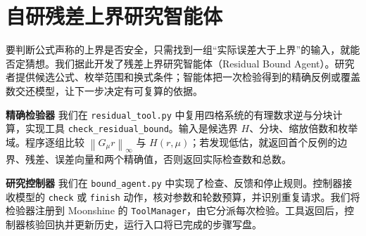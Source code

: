 \documentclass[UTF8,a4paper,12pt]{ctexart}
\newcommand{\papersectionbreak}{\par\addvspace{4.5mm}\Needspace{5\baselineskip}}
\newcommand{\para}[1]{\par\addvspace{.62\baselineskip}\noindent
  {\paperlabel\sffamily\bfseries\fontsize{10.7}{15}\selectfont\color{ink}#1}\hspace{.66em}\ignorespaces}
\newcommand{\norm}[1]{\left\lVert #1\right\rVert_\infty}
\begin{document}
\papersectionbreak
\clearpage
\section{自研残差上界研究智能体}\label{extension}
要判断公式声称的上界是否安全，只需找到一组“实际误差大于上界”的输入，就能否定猜想。我们据此开发了残差上界研究智能体（Residual Bound Agent）。研究者提供候选公式、枚举范围和换式条件；智能体把一次检验得到的精确反例或覆盖数交还模型，让下一步决定有可复算的依据。

\para{精确检验器} 我们在 \texttt{residual\_tool.py} 中复用四格系统的有理数求逆与分块计算，实现工具 \texttt{check\_residual\_bound}。输入是候选界 $H$、分块、缩放倍数和枚举域。程序逐组比较 $\norm{G_\mu r}$ 与 $H(r,\mu)$；若发现低估，就返回首个反例的边界、残差、误差向量和两个精确值，否则返回实际检查数和总数。

\para{研究控制器} 我们在 \texttt{bound\_agent.py} 中实现了检查、反馈和停止规则。控制器接收模型的 \texttt{check} 或 \texttt{finish} 动作，核对参数和轮数预算，并识别重复请求。我们将检验器注册到 Moonshine 的 \texttt{ToolManager}，由它分派每次检验。工具返回后，控制器核验回执并更新历史，运行入口将已完成的步骤写盘。
\end{document}
